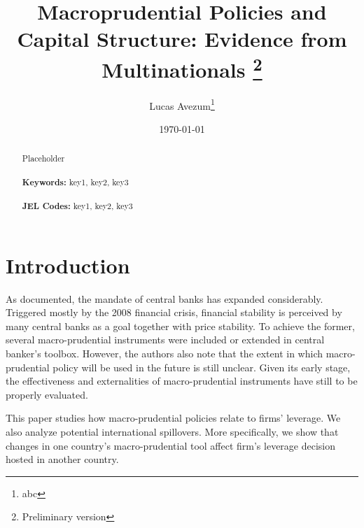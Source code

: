 \documentclass[12pt]{article}
\begin{document}
	
	\begin{titlepage}
		\title{Macroprudential Policies and Capital Structure: Evidence from Multinationals \thanks{Preliminary version}}
		\author{Lucas Avezum\thanks{abc}}
		\date{\today}
		\maketitle
		\begin{abstract}
			\noindent Placeholder\\
			\vspace{0in}\\
			\noindent\textbf{Keywords:} key1, key2, key3\\
			\vspace{0in}\\
			\noindent\textbf{JEL Codes:} key1, key2, key3\\
			
			\bigskip
		\end{abstract}
		\setcounter{page}{0}
		\thispagestyle{empty}
	\end{titlepage}
	\pagebreak \newpage
	
	
	
	
	\doublespacing
	
	
	\section{Introduction} \label{sec:introduction}
	As \cite*{blinder2016necessity} documented, the mandate of central banks has expanded considerably. Triggered mostly by the 2008 financial crisis, financial stability is perceived by many central banks as a goal together with price stability. To achieve the former, several macro-prudential instruments were included or extended in central banker's toolbox. However, the authors also note that the extent in which macro-prudential policy will be used in the future is still unclear. Given its early stage, the effectiveness and externalities of macro-prudential instruments have still to be properly evaluated. 
	
	This paper studies how macro-prudential policies relate to firms' leverage. We also analyze potential international spillovers. More specifically, we show that changes in one country's macro-prudential tool affect firm's leverage decision hosted in another country. 
	
\end{document}
